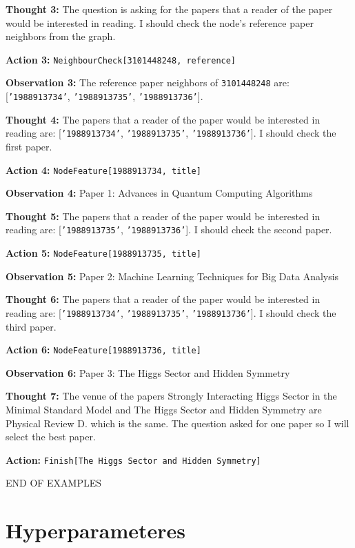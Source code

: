 \textbf{Thought 3:} The question is asking for the papers that a reader of the paper would be interested in reading. I should check the node's reference paper neighbors from the graph. \par
\textbf{Action 3:} \texttt{NeighbourCheck[3101448248, reference]} \par
\textbf{Observation 3:} The reference paper neighbors of \texttt{3101448248} are: [\texttt{'1988913734'}, \texttt{'1988913735'}, \texttt{'1988913736'}]. \par

\textbf{Thought 4:} The papers that a reader of the paper would be interested in reading are: [\texttt{'1988913734'}, \texttt{'1988913735'}, \texttt{'1988913736'}]. I should check the first paper. \par
\textbf{Action 4:} \texttt{NodeFeature[1988913734, title]} \par
\textbf{Observation 4:} Paper 1: Advances in Quantum Computing Algorithms \par

\textbf{Thought 5:} The papers that a reader of the paper would be interested in reading are: [\texttt{'1988913735'}, \texttt{'1988913736'}]. I should check the second paper. \par
\textbf{Action 5:} \texttt{NodeFeature[1988913735, title]} \par
\textbf{Observation 5:} Paper 2: Machine Learning Techniques for Big Data Analysis \par

\textbf{Thought 6:} The papers that a reader of the paper would be interested in reading are: [\texttt{'1988913734'}, \texttt{'1988913735'}, \texttt{'1988913736'}]. I should check the third paper. \par
\textbf{Action 6:} \texttt{NodeFeature[1988913736, title]} \par
\textbf{Observation 6:} Paper 3: The Higgs Sector and Hidden Symmetry \par

\textbf{Thought 7:} The venue of the papers Strongly Interacting Higgs Sector in the Minimal Standard Model and The Higgs Sector and Hidden Symmetry are Physical Review D. which is the same. The question asked for one paper so I will select the best paper. \par
\textbf{Action:} \texttt{Finish[The Higgs Sector and Hidden Symmetry]} \par

END OF EXAMPLES


\section{Hyperparameteres}
\label{sec:appendix_hyperparameters}


